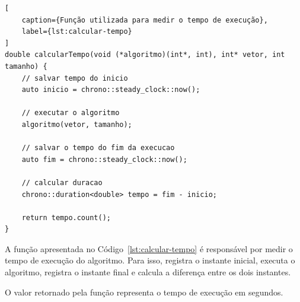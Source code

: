 \begin{lstlisting}[
    caption={Função utilizada para medir o tempo de execução},
    label={lst:calcular-tempo}
]
double calcularTempo(void (*algoritmo)(int*, int), int* vetor, int tamanho) {
    // salvar tempo do inicio
    auto inicio = chrono::steady_clock::now();

    // executar o algoritmo
    algoritmo(vetor, tamanho);

    // salvar o tempo do fim da execucao
    auto fim = chrono::steady_clock::now();

    // calcular duracao
    chrono::duration<double> tempo = fim - inicio;

    return tempo.count();
}
\end{lstlisting}

A função apresentada no Código~\ref{lst:calcular-tempo} é responsável por
medir o tempo de execução do algoritmo. Para isso, registra o instante
inicial, executa o algoritmo, registra o instante final e calcula a
diferença entre os dois instantes.

O valor retornado pela função representa o tempo de execução em segundos.